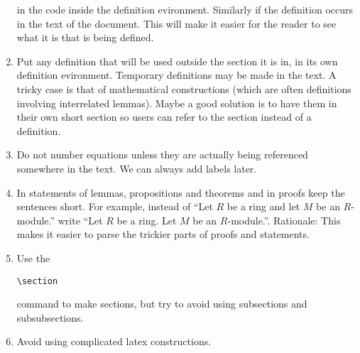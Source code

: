 \begin{enumerate}
\begin{verbatim}
\end{verbatim}
in the code inside the definition evironment.
Similarly if the definition occurs in the text of the document.
This will make it easier for the reader to see what it is
that is being defined.
\item Put any definition that will be used outside the section
it is in, in its own definition evironment. Temporary definitions
may be made in the text. A tricky case is that of mathematical
constructions (which are often definitions involving interrelated
lemmas). Maybe a good solution is to have them in their own
short section so users can refer to the section instead of
a definition.
\item Do not number equations unless they are actually being
referenced somewhere in the text. We can always add labels later.
\item In statements of lemmas, propositions and theorems and
in proofs keep the sentences short. For example, instead of
``Let $R$ be a ring and let $M$ be an $R$-module.'' write
``Let $R$ be a ring. Let $M$ be an $R$-module.''. Rationale:
This makes it easier to parse the trickier parts of proofs and
statements.
\item Use the
\begin{verbatim}
\section
\end{verbatim}
command to make sections, but try to avoid using subsections
and subsubsections.
\item Avoid using complicated latex constructions.
\end{enumerate}











